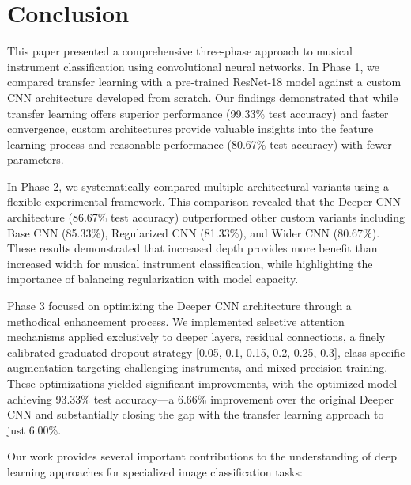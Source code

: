 \section{Conclusion}
This paper presented a comprehensive three-phase approach to musical instrument classification using convolutional neural networks. In Phase 1, we compared transfer learning with a pre-trained ResNet-18 model against a custom CNN architecture developed from scratch. Our findings demonstrated that while transfer learning offers superior performance (99.33\% test accuracy) and faster convergence, custom architectures provide valuable insights into the feature learning process and reasonable performance (80.67\% test accuracy) with fewer parameters.

In Phase 2, we systematically compared multiple architectural variants using a flexible experimental framework. This comparison revealed that the Deeper CNN architecture (86.67\% test accuracy) outperformed other custom variants including Base CNN (85.33\%), Regularized CNN (81.33\%), and Wider CNN (80.67\%). These results demonstrated that increased depth provides more benefit than increased width for musical instrument classification, while highlighting the importance of balancing regularization with model capacity.

Phase 3 focused on optimizing the Deeper CNN architecture through a methodical enhancement process. We implemented selective attention mechanisms applied exclusively to deeper layers, residual connections, a finely calibrated graduated dropout strategy [0.05, 0.1, 0.15, 0.2, 0.25, 0.3], class-specific augmentation targeting challenging instruments, and mixed precision training. These optimizations yielded significant improvements, with the optimized model achieving 93.33\% test accuracy—a 6.66\% improvement over the original Deeper CNN and substantially closing the gap with the transfer learning approach to just 6.00\%.

Our work provides several important contributions to the understanding of deep learning approaches for specialized image classification tasks:

